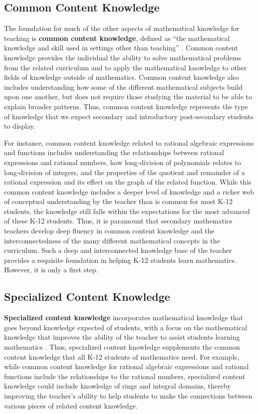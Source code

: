 \documentclass[
]{book}
\theoremstyle{definition}
\theoremstyle{definition}
\theoremstyle{definition}
\theoremstyle{definition}
\theoremstyle{remark}
\begin{document}
\hypertarget{common-content-knowledge}{%
\subsection{Common Content Knowledge}\label{common-content-knowledge}}

The foundation for much of the other aspects of mathematical knowledge for teaching is \textbf{common content knowledge}, defined as ``the mathematical knowledge and skill used in settings other than teaching'' \citep[p.~399]{Ball2008}. Common content knowledge provides the individual the ability to solve mathematical problems from the related curriculum and to apply the mathematical knowledge to other fields of knowledge outside of mathematics. Common content knowledge also includes understanding how some of the different mathematical subjects build upon one another, but does not require those studying the material to be able to explain broader patterns. Thus, common content knowledge represents the type of knowledge that we expect secondary and introductory post-secondary students to display.

For instance, common content knowledge related to rational algebraic expressions and functions includes understanding the relationships between rational expressions and rational numbers, how long-division of polynomials relates to long-division of integers, and the properties of the quotient and remainder of a rational expression and its effect on the graph of the related function. While this common content knowledge includes a deeper level of knowledge and a richer web of conceptual understanding by the teacher than is common for most K-12 students, the knowledge still falls within the expectations for the most advanced of these K-12 students. Thus, it is paramount that secondary mathematics teachers develop deep fluency in common content knowledge and the interconnectedness of the many different mathematical concepts in the curriculum. Such a deep and interconnected knowledge base of the teacher provides a requisite foundation in helping K-12 students learn mathematics. However, it is only a first step.

\hypertarget{specialized-content-knowledge}{%
\subsection{Specialized Content Knowledge}\label{specialized-content-knowledge}}

\textbf{Specialized content knowledge} incorporates mathematical knowledge that goes beyond knowledge expected of students, with a focus on the mathematical knowledge that improves the ability of the teacher to assist students learning mathematics \citep[p.~400]{Ball2008}. Thus, specialized content knowledge supplements the common content knowledge that all K-12 students of mathematics need. For example, while common content knowledge for rational algebraic expressions and rational functions include the relationships to the rational numbers, specialized content knowledge could include knowledge of rings and integral domains, thereby improving the teacher's ability to help students to make the connections between various pieces of related content knowledge.
\end{document}
